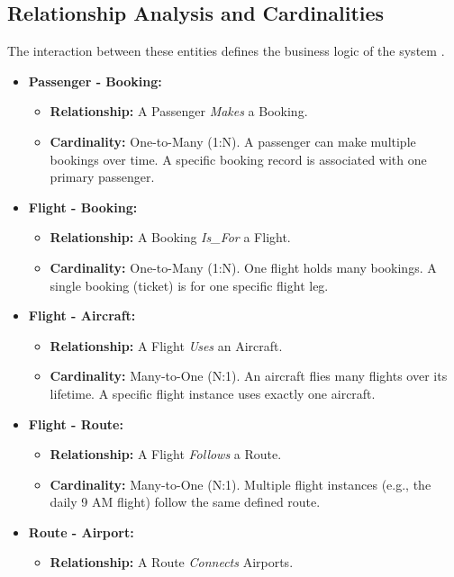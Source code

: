 \documentclass[12pt, a4paper]{article}
\begin{document}
	\subsection{Relationship Analysis and Cardinalities}
	
	The interaction between these entities defines the business logic of the system \cite{ref14, ref38}.
	
	\begin{itemize}
		\item \textbf{Passenger - Booking:}
		\begin{itemize}
			\item \textbf{Relationship:} A Passenger \textit{Makes} a Booking.
			\item \textbf{Cardinality:} One-to-Many (1:N). A passenger can make multiple bookings over time. A specific booking record is associated with one primary passenger.
		\end{itemize}
		\item \textbf{Flight - Booking:}
		\begin{itemize}
			\item \textbf{Relationship:} A Booking \textit{Is\_For} a Flight.
			\item \textbf{Cardinality:} One-to-Many (1:N). One flight holds many bookings. A single booking (ticket) is for one specific flight leg.
		\end{itemize}
		\item \textbf{Flight - Aircraft:}
		\begin{itemize}
			\item \textbf{Relationship:} A Flight \textit{Uses} an Aircraft.
			\item \textbf{Cardinality:} Many-to-One (N:1). An aircraft flies many flights over its lifetime. A specific flight instance uses exactly one aircraft.
		\end{itemize}
		\item \textbf{Flight - Route:}
		\begin{itemize}
			\item \textbf{Relationship:} A Flight \textit{Follows} a Route.
			\item \textbf{Cardinality:} Many-to-One (N:1). Multiple flight instances (e.g., the daily 9 AM flight) follow the same defined route.
		\end{itemize}
		\item \textbf{Route - Airport:}
		\begin{itemize}
			\item \textbf{Relationship:} A Route \textit{Connects} Airports.

\end{itemize}
\end{itemize}
\end{document}
